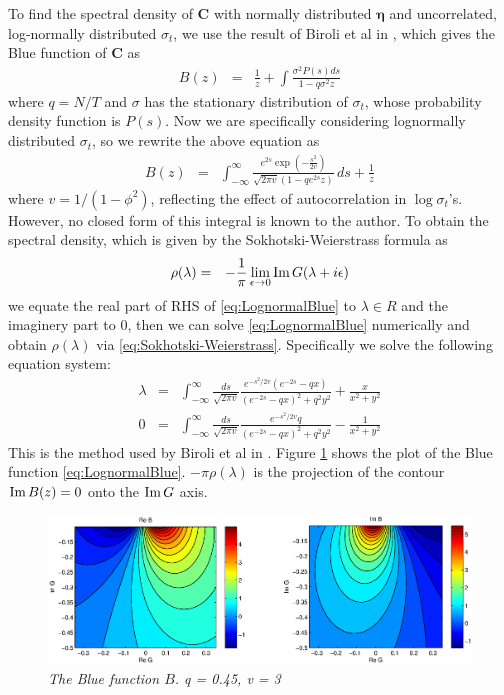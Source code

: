 \documentclass{article}
\begin{document}
To find the spectral density of $\bm C$ with normally distributed $\bm
\eta$ and uncorrelated, log-normally distributed $\sigma_t$, we use
the result of Biroli et al in \cite{biroli2007student}, which gives
the Blue function of $\bm C$ as
\begin{eqnarray*}
  B(z) &=& \frac{1}{z} + \int \frac{\sigma ^2 P(s) ds}{1-q \sigma ^2 z}
\end{eqnarray*}
where $q = N/T$ and $\sigma$ has the stationary distribution of
$\sigma_t$, whose probability density function is $P(s)$. Now we are
specifically considering lognormally distributed $\sigma_t$, so we
rewrite the above equation as
\begin{eqnarray}
B(z) &=& \int_{-\infty }^{\infty } \frac{e^{2 s} \exp \left(-\frac{s^2}{2
      v}\right)}{\sqrt{2 \pi  v} \left(1-q e^{2 s} z\right)} \,
ds+\frac{1}{z} \label{eq:LognormalBlue}
\end{eqnarray}
where $v = 1/(1 - \phi^2)$, reflecting the effect
of autocorrelation in $\log \sigma_t$'s. However, no closed form of
this integral is known to the author. To obtain the spectral density,
which is given by the Sokhotski-Weierstrass formula as
\begin{eqnarray}
  \rho(\lambda) &=& -{1 \over \pi} \lim_{\epsilon \to 0} \text{Im}\, G(\lambda +
  i\epsilon) \label{eq:Sokhotski-Weierstrass}
\end{eqnarray}
we equate the real part of RHS of \eqref{eq:LognormalBlue} to $\lambda \in
R$ and the imaginery part to 0, then we can solve \eqref{eq:LognormalBlue}
numerically and obtain $\rho(\lambda)$ via
\eqref{eq:Sokhotski-Weierstrass}. Specifically we solve the following
equation system:
\begin{eqnarray}
\lambda &=& \int_{-\infty}^{\infty} \frac{ds}{\sqrt{2\pi v}}
\frac{
  e^{-s^2/2v}(e^{-2s} - qx)
}{
  (e^{-2s} - qx)^2 + q^2 y^2  
} +
\frac{x}{x^2 + y^2} \label{eq:LognormalBlueReal}\\
0 &=& \int_{-\infty}^{\infty} \frac{ds}{\sqrt{2\pi v}}
\frac{
  e^{-s^2/2v} q
}{
  (e^{-2s} - qx)^2 + q^2 y^2  
} -
\frac{1}{x^2 + y^2} \label{eq:LognormalBlueImag}
\end{eqnarray}
This is the method used by Biroli et al in
\cite{biroli2007student}. Figure \ref{fig:LognormalBlue}
shows the plot of the Blue function \eqref{eq:LognormalBlue}. $-\pi
\rho(\lambda)$ is the projection of the contour $\text{Im}\, B(z) = 0$ onto the $\text{Im}\,
G$ axis.
\begin{figure}[htb!]
  \centering
    \includegraphics[scale=0.45, clip=true, trim=66 0 84
    0]{../pics/LognormalBlue.eps}
  \caption{\small \it The Blue function $B$. q = 0.45, v = 3}
  \label{fig:LognormalBlue}
\end{figure}
\end{document}
